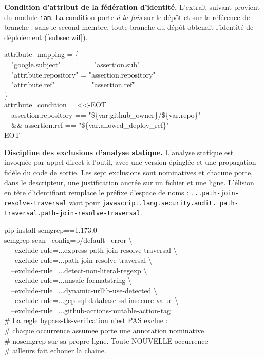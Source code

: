 \textbf{Condition d'attribut de la fédération d'identité.} L'extrait suivant provient du module
\texttt{iam}. La condition porte \emph{à la fois} sur le dépôt et sur la référence de branche :
sans le second membre, toute branche du dépôt obtenait l'identité de déploiement
(\cref{subsec:wif}).

\begin{extraitconf}[boxsep=1pt, left=3pt, right=3pt, top=2pt, bottom=2pt]
attribute\_mapping = \{\\
\ \ "google.subject"\ \ \ \ \ \ \ = "assertion.sub"\\
\ \ "attribute.repository" = "assertion.repository"\\
\ \ "attribute.ref"\ \ \ \ \ \ \ \ = "assertion.ref"\\
\}\\[0.4em]
attribute\_condition = <<-EOT\\
\ \ assertion.repository == "\$\{var.github\_owner\}/\$\{var.repo\}"\\
\ \ \&\& assertion.ref == "\$\{var.allowed\_deploy\_ref\}"\\
EOT
\end{extraitconf}

\textbf{Discipline des exclusions d'analyse statique.} L'analyse statique est invoquée par appel
direct à l'outil, avec une version épinglée et une propagation fidèle du code de sortie. Les sept
exclusions sont nominatives et chacune porte, dans le descripteur, une justification ancrée sur un
fichier et une ligne. L'élision en tête d'identifiant remplace le préfixe d'espace de noms :
\texttt{...path-join-resolve-traversal} vaut pour
\texttt{javascript.\allowbreak lang.\allowbreak security.\allowbreak audit.\allowbreak
path-traversal.\allowbreak path-join-resolve-traversal}.

\begin{extraitconf}[boxsep=1pt, left=3pt, right=3pt, top=2pt, bottom=2pt]
pip install semgrep==1.173.0\\
semgrep scan --config=p/default --error \textbackslash\\
\ \ --exclude-rule=...express-path-join-resolve-traversal \textbackslash\\
\ \ --exclude-rule=...path-join-resolve-traversal \textbackslash\\
\ \ --exclude-rule=...detect-non-literal-regexp \textbackslash\\
\ \ --exclude-rule=...unsafe-formatstring \textbackslash\\
\ \ --exclude-rule=...dynamic-urllib-use-detected \textbackslash\\
\ \ --exclude-rule=...gcp-sql-database-ssl-insecure-value \textbackslash\\
\ \ --exclude-rule=...github-actions-mutable-action-tag\\[0.4em]
\# La regle bypass-tls-verification n'est PAS exclue :\\
\# chaque occurrence assumee porte une annotation nominative\\
\# nosemgrep sur sa propre ligne. Toute NOUVELLE occurrence\\
\# ailleurs fait echouer la chaine.
\end{extraitconf}

